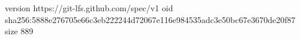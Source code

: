 version https://git-lfs.github.com/spec/v1
oid sha256:5888e276705e66c3eb222244d72067e116e984535adc3e50bc67e3670de20f87
size 889
